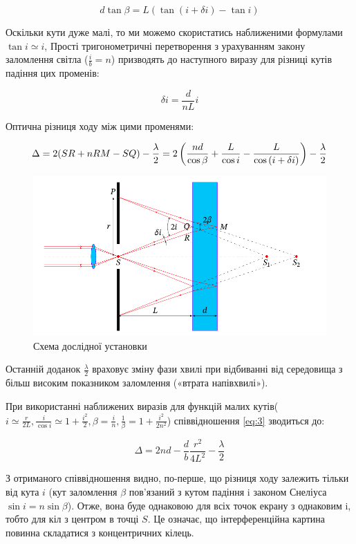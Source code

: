 \begin{equation} \label{eq:1}
    d \tan{\beta} = L(\tan{(i+ \delta i)} - \tan{i})
\end{equation}

Оскільки кути дуже малі, то ми можемо скористатись наближеними 
формулами $\tan{i} \simeq i $, Прості тригонометричні перетворення з урахуванням закону 
заломлення світла ($ \frac{i}{b} = n $) призводять до наступного виразу для різниці кутів
падіння цих променів:

\begin{equation} \label{eq:2}
    \delta i = \frac{d}{nL}i
\end{equation}

Оптична різниця ходу між цими променями:

\begin{equation} \label{eq:3}
    \Delta = 2(SR + n RM - SQ ) - \frac{\lambda}{2} = \\
    2 \left( \frac{nd}{\cos{\beta}} + \frac{L}{\cos{i}} - \frac{L}{\cos{(i + \delta i)}} \right) - \frac{\lambda}{2}
\end{equation}

\begin{figure}[h]
    \centering    
    \includegraphics[width=.5\textwidth]{assets/main_scheme.png}       
    \caption{Схема дослідної установки}
\end{figure}

Останній доданок $\frac{\lambda}{2}$
враховує зміну фази хвилі при відбиванні від середовища
з більш високим показником заломлення («втрата напівхвилі»).

При використанні наближених виразів для функцій малих кутів(
$i \simeq \frac{r}{2L}, 
\frac{i}{\cos{i}} \simeq 1 + \frac{i^2}{2},
\beta = \frac{i}{n}, \frac{1}{\beta} = 1 + \frac{i^2}{2n^2} $)
співвідношення \ref{eq:3} зводиться до:

\begin{equation} \label{eq:4}
    \Delta = 2nd - \frac{d}{b} \frac{r^2}{4L^2} - \frac{\lambda}{2}
\end{equation}

З отриманого співвідношення видно, по-перше,
що різниця ходу залежить тільки від кута $i$
(кут заломлення $\beta$ пов’язаний з кутом падіння
i законом Снеліуса $\sin{i} = n \sin{\beta}$). Отже,
вона буде однаковою для всіх точок екрану з
однаковим i, тобто для кіл з центром в точці $S$.
Це означає, що інтерференційна картина повинна складатися з концентричних кілець.


